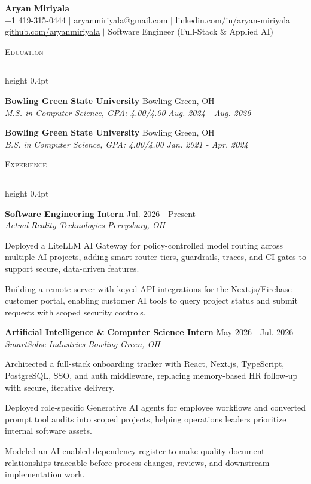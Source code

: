 \documentclass[letterpaper,11pt]{article}
\newcommand{\resumesection}[1]{%
  \par\vspace{2pt}%
  {\large\scshape #1}\par\vspace{2pt}%
  \hrule height 0.4pt\vspace{2pt}%
}
\newcommand{\resumeSubheading}[4]{
  \textbf{#1} \hfill #2\\
  \textit{#3} \hfill \textit{#4}
}
\begin{document}
\begin{center}
  {\LARGE \textbf{Aryan Miriyala}}\\[2pt]
  \small
  +1 419-315-0444 $|$ \href{mailto:aryanmiriyala@gmail.com}{aryanmiriyala@gmail.com} $|$ \href{https://www.linkedin.com/in/aryan-miriyala-7788a21b6/}{linkedin.com/in/aryan-miriyala}\\
  \href{https://github.com/aryanmiriyala}{github.com/aryanmiriyala} $|$ Software Engineer (Full-Stack \& Applied AI)
\end{center}\vspace{-6pt}

\resumesection{Education}
\resumeSubheading
{Bowling Green State University}{Bowling Green, OH}
{M.S. in Computer Science, GPA: 4.00/4.00}{Aug. 2024 - Aug. 2026}

\resumeSubheading
{Bowling Green State University}{Bowling Green, OH}
{B.S. in Computer Science, GPA: 4.00/4.00}{Jan. 2021 - Apr. 2024}

\resumesection{Experience}
\resumeSubheading
{Software Engineering Intern}{Jul. 2026 - Present}
{Actual Reality Technologies}{Perrysburg, OH}
\begin{tightitemize}
  \item Deployed a LiteLLM AI Gateway for policy-controlled model routing across multiple AI projects, adding smart-router tiers, guardrails, traces, and CI gates to support secure, data-driven features.
  \item Building a remote server with keyed API integrations for the Next.js/Firebase customer portal, enabling customer AI tools to query project status and submit requests with scoped security controls.
\end{tightitemize}

\resumeSubheading
{Artificial Intelligence \& Computer Science Intern}{May 2026 - Jul. 2026}
{SmartSolve Industries}{Bowling Green, OH}
\begin{tightitemize}
  \item Architected a full-stack onboarding tracker with React, Next.js, TypeScript, PostgreSQL, SSO, and auth middleware, replacing memory-based HR follow-up with secure, iterative delivery.
  \item Deployed role-specific Generative AI agents for employee workflows and converted prompt tool audits into scoped projects, helping operations leaders prioritize internal software assets.
  \item Modeled an AI-enabled dependency register to make quality-document relationships traceable before process changes, reviews, and downstream implementation work.
\end{tightitemize}
\end{document}
